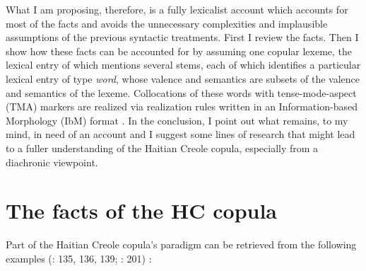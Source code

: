 \documentclass[output=paper]{langsci/langscibook}
\begin{document}
What I am proposing, therefore, is a fully lexicalist account which
accounts for most of the facts and avoids the unnecessary complexities
and implausible assumptions of the previous syntactic treatments. First
I review the facts. Then I show how these facts can be accounted for by
assuming one copular lexeme, the lexical entry of which mentions several
stems, each of which identifies a particular lexical entry of type
\emph{word}, whose valence and semantics are subsets of the valence and
semantics of the lexeme. Collocations of these words with tense-mode-aspect (TMA) markers
are realized via realization rules written in an Information-based
Morphology (IbM) format %
\citep{Crysmann2015}.%
%
In the conclusion, I
point out what remains, to my mind, in need of an account and I suggest
some lines of research that might lead to a fuller understanding of the
Haitian Creole copula, especially from a diachronic viewpoint.

\section{The facts of the HC copula }

Part of the Haitian Creole copula's paradigm can be retrieved from the
following examples %
(\citealt{Deprez2003}: 135, 136, 139; \citealt{Fattier2013}: 201)
%
:
\end{document}

